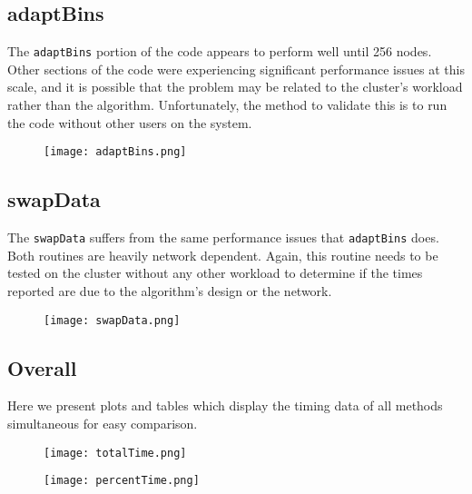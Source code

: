 \documentclass{article}
\begin{document}
\subsection{adaptBins}
The \texttt{adaptBins} portion of the code appears to perform well until 256 nodes. Other sections of the code were experiencing significant performance issues at this scale, and it is possible that the problem may be related to the cluster's workload rather than the algorithm. Unfortunately, the method to validate this is to run the code without other users on the system.
\begin{figure}[!htb]
	\centering
	\texttt{[image: adaptBins.png]}
\end{figure}

\subsection{swapData}
The \texttt{swapData} suffers from the same performance issues that \texttt{adaptBins} does. Both routines are heavily network dependent. Again, this routine needs to be tested on the cluster without any other workload to determine if the times reported are due to the algorithm's design or the network.
\begin{figure}[!htb]
	\centering
	\texttt{[image: swapData.png]}
\end{figure}

\subsection{Overall}
Here we present plots and tables which display the timing data of all methods simultaneous for easy comparison.
\begin{figure}[!htb]
	\centering
	\texttt{[image: totalTime.png]}
\end{figure}

\begin{figure}[!htb]
	\centering
	\texttt{[image: percentTime.png]}
\end{figure}
\end{document}
